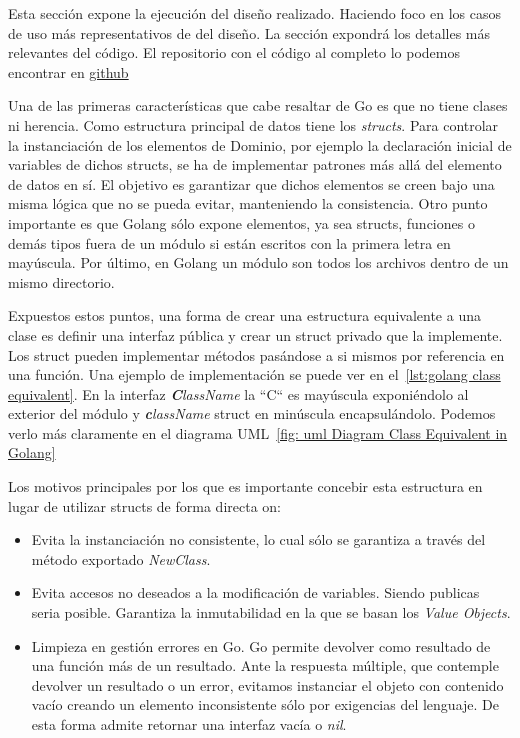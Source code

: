 Esta sección expone la ejecución del diseño realizado.
Haciendo foco en los casos de uso más representativos de del diseño.
La sección expondrá los detalles más relevantes del código.
El repositorio con el código al completo lo podemos encontrar en \href{https://github.com/Enrikerf/pfm}{github}

Una de las primeras características que cabe resaltar de Go es que no tiene clases ni herencia.
Como estructura principal de datos tiene los \textit{structs}.
Para controlar la instanciación de los elementos de Dominio, por ejemplo la declaración inicial de variables de dichos structs, se ha de implementar patrones más allá del elemento de datos en sí.
El objetivo es garantizar que dichos elementos se creen bajo una misma lógica que no se pueda evitar, manteniendo la consistencia.
Otro punto importante es que Golang sólo expone elementos, ya sea structs, funciones o demás tipos fuera de un módulo si están escritos con la primera letra en mayúscula.
Por último, en Golang un módulo son todos los archivos dentro de un mismo directorio.

Expuestos estos puntos, una forma de crear una estructura equivalente a una clase es definir una interfaz pública y crear un struct privado que la implemente.
Los struct pueden implementar métodos pasándose a si mismos por referencia en una función.
Una ejemplo de implementación se puede ver en el~\cref{lst:golang class equivalent}.
En la interfaz \textit{\textbf{C}lassName} la “C“ es mayúscula exponiéndolo al exterior del módulo y \textit{\textbf{c}lassName} struct en minúscula encapsulándolo.
Podemos verlo más claramente en el diagrama UML~\cref{fig: uml Diagram Class Equivalent in Golang}

Los motivos principales por los que es importante concebir esta estructura en lugar de utilizar structs de forma directa on:

\begin{itemize}
    \item Evita la instanciación no consistente, lo cual sólo se garantiza a través del método exportado \textit{NewClass}.
    \item Evita accesos no deseados a la modificación de variables.
    Siendo publicas seria posible.
    Garantiza la inmutabilidad en la que se basan los \textit{Value Objects}.
    \item Limpieza en gestión errores en Go. Go permite devolver como resultado de una función más de un resultado.
    Ante la respuesta múltiple, que contemple devolver un resultado o un error, evitamos instanciar el objeto con contenido vacío creando un elemento inconsistente sólo por exigencias del lenguaje.
    De esta forma admite retornar una interfaz vacía o \textit{nil}.
\end{itemize}

